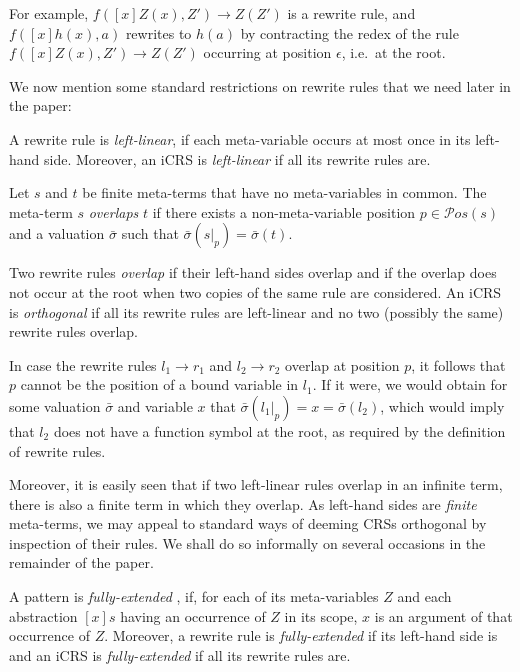 \documentclass{LMCS}
\theoremstyle{definition}
\newcommand{\rew}{\rightarrow}
\newcommand{\pos}[1]{\mathcal{P}os(#1)}
\begin{document}
For example, $f([x]Z(x),Z') \rightarrow Z(Z')$ is a rewrite rule,
and $f([x]h(x),a)$ rewrites to $h(a)$ by contracting the redex of the rule 
$f([x]Z(x),Z') \rightarrow Z(Z')$ occurring at position $\epsilon$, i.e.\ at the root.

We now mention some standard restrictions on rewrite rules 
that we need later in the paper: 

\begin{defi}
A rewrite rule is \emph{left-linear}, if each meta-variable occurs at
most once in its left-hand side. Moreover, an iCRS is \emph{left-linear}
if all its rewrite rules are.
\end{defi}

\begin{defi}
Let $s$ and $t$ be finite meta-terms that have no meta-variables in common. The meta-term $s$ \emph{overlaps} $t$ if there exists a non-meta-variable position $p \in \pos{s}$ and a valuation $\bar{\sigma}$ such that $\bar{\sigma}(s|_p) = \bar{\sigma}(t)$.

Two rewrite rules \emph{overlap} if their left-hand sides overlap and if the overlap does not occur at the root when two copies of the same rule are considered. An iCRS is \emph{orthogonal} if all its rewrite rules are left-linear and no two (possibly the same) rewrite rules overlap.
\end{defi}

In case the rewrite rules $l_1 \rew r_1$ and $l_2 \rew r_2$ overlap
at position $p$, it follows that $p$ cannot be the position of a
bound variable in $l_1$. If it were, we would obtain for some valuation
$\bar{\sigma}$ and variable $x$ that $\bar{\sigma}(l_1|_p) = x = 
\bar{\sigma}(l_2)$, which would imply that $l_2$ does not have
a function symbol at the root, as required by the definition of
rewrite rules.

Moreover, it is easily seen that if two left-linear rules overlap in an infinite term, there is also a finite term in which they overlap. As left-hand sides are
\emph{finite} meta-terms, we may appeal to standard ways of deeming
CRSs orthogonal by inspection of their rules.
We shall do so informally on several occasions in the
remainder of the paper. 


\begin{defi}
\label{def:fully_extended}
A pattern is \emph{fully-extended} \cite{HP96,O96}, if, for each of
its meta-variables $Z$ and each abstraction $[x]s$ having an
occurrence of $Z$ in its scope, $x$ is an argument of that occurrence
of $Z$. Moreover, a rewrite rule is \emph{fully-extended} if its
left-hand side is and an iCRS is \emph{fully-extended} if all its
rewrite rules are.
\end{defi}
\end{document}
